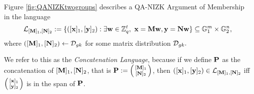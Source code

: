 Figure \ref{fig:QANIZKtwogroups} describes a QA-NIZK Argument of Membership in the language 
$$\mathcal{L}_{[\matr{M}]_1,[\matr{N}]_2}:=\{ ([\vecb{x}]_1,[\vecb{y}]_2): \exists \vecb{w} \in \Z_q^{t}, \ \vecb{x}=\matr{M}\vecb{w},   \vecb{y}=\matr{N}\vecb{w} \} \subseteq \GG_1^{m} \times \GG_2^{n},$$
where $([\mathbf{{M}}]_1,[\mathbf{{N}}]_2)\gets\mathcal{D}_{gk}$ for some matrix distribution $\mathcal{D}_{gk}.$

We refer to this as the \textit{Concatenation Language}, because 
if we define $\mathbf{{P}}$ as the concatenation of $[\mathbf{{M}}]_1,[\mathbf{{N}}]_2$, that is $\matr{P}:=\smallpmatrix{[\matr{M}]_1 \\ [\matr{N}]_2}$, then  $([\mathbf{x}]_1,[\mathbf{y}]_2) \in \mathcal{L}_{[\mathbf{{M}}]_1,[\mathbf{{N}}]_2}$ iff $\smallpmatrix{[\vecb{x}]_1 \\ [\vecb{y}]_2}$ is in the span of $\mathbf{{P}}$.
